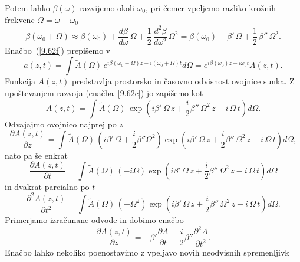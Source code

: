 Potem lahko $\beta(\omega)$
razvijemo okoli $\omega_{0}$, pri čemer vpeljemo razliko krožnih frekvenc $\Omega = \omega - \omega_0$
\begin{equation}
\beta(\omega_0 + \Omega) \approx \beta(\omega_{0})
+\frac{d\beta}{d\omega}\,\Omega+\frac{1}{2}\,\frac{d^{2}\beta}{d\omega^{2}}\,\Omega^{2} = 
\beta(\omega_{0}) +\beta '\,\Omega+\frac{1}{2}\,\beta ''\,\Omega^{2}.
\label{9.62c}
\end{equation}
Enačbo~(\ref{9.62f}) prepišemo v 
\begin{equation}
a\left(z,t\right)=\int \tilde{A}(\Omega)\, e^{i \beta (\omega_0 + \Omega)z - 
i(\omega_0 + \Omega) t}d\Omega  =  e^{i \beta (\omega_0)z - i\omega_0 t} A(z,t).
\label{9.62b}
\end{equation}
Funkcija $A(z, t)$ predstavlja prostorsko in časovno odvisnost ovojnice sunka. Z upoštevanjem
razvoja (enačba~\ref{9.62c}) jo zapišemo kot 
\begin{equation}
 A(z,t) = \int \tilde{A}(\Omega)\, \exp \left(i \beta'\, \Omega\,z + 
 \frac{i}{2}\beta''\,\Omega^2\, z - i\, \Omega\, t\right) d\Omega.
 \label{eq:ovojnica967}
\end{equation}
Odvajajmo ovojnico najprej po $z$
\begin{equation}
 \frac{\partial A(z,t)}{\partial z} = \int \tilde{A}(\Omega)\, 
 \left(i \beta'\, \Omega + \frac{i}{2}\beta''\Omega^2 \right) 
 \exp \left(i \beta'\, \Omega\,z + 
 \frac{i}{2}\beta''\,\Omega^2\, z - i\, \Omega\, t\right) d\Omega,
\label{9.67a}
\end{equation}
nato pa še enkrat 
\begin{equation}
 \frac{\partial A(z,t)}{\partial t} = \int \tilde{A}(\Omega)\, 
 \left(-i\Omega\right) 
 \exp \left(i \beta'\, \Omega\,z + 
 \frac{i}{2}\beta''\,\Omega^2\, z - i\, \Omega\, t\right) d\Omega
\label{9.67b}
\end{equation}
in dvakrat parcialno po $t$
\begin{equation}
 \frac{\partial^2 A(z,t)}{\partial t^2} = \int \tilde{A}(\Omega)\, 
 \left(-\Omega^2\right) 
 \exp \left(i \beta'\, \Omega\,z + 
 \frac{i}{2}\beta''\,\Omega^2\, z - i\, \Omega\, t\right) d\Omega.
\label{9.67c}
\end{equation}
Primerjamo izračunane odvode in dobimo enačbo
\begin{equation}
 \frac{\partial A(z,t)}{\partial z} = -\beta'\frac{\partial A}{\partial t} - \frac{i}{2} \beta''\frac{\partial^2 A}{\partial t^2}.
 \label{9.68b}
\end{equation}
Enačbo lahko nekoliko poenostavimo z vpeljavo novih neodvisnih spremenljivk

